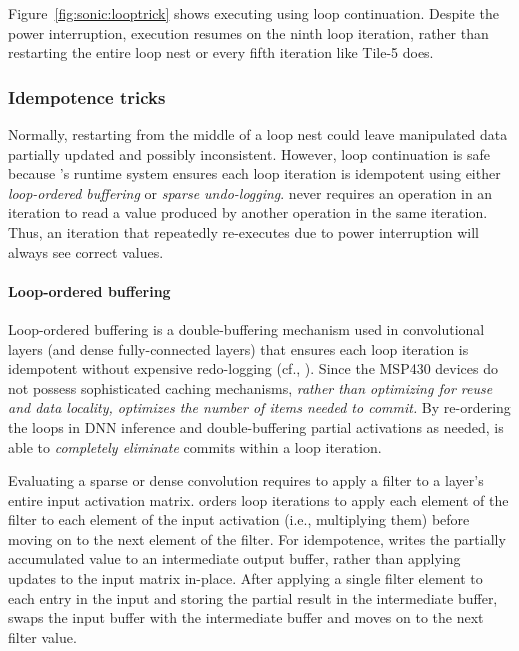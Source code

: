 Figure~\ref{fig:sonic:looptrick} shows \sonic executing using loop
continuation.  Despite the power interruption, execution resumes on the ninth
loop iteration, rather than restarting the entire loop nest or every fifth iteration
like Tile-5 does.

\subsubsection{Idempotence tricks}
\label{sonic:sonic:idempotence}

Normally, restarting from the middle of a loop nest could leave manipulated
data partially updated and possibly inconsistent.  However, loop continuation
is safe because \sonic's runtime system ensures each loop iteration is idempotent
using either {\em loop-ordered buffering} or {\em sparse undo-logging}.
%
\sonic never requires an operation in an iteration to read a value
produced by another operation in the same iteration.
Thus, an iteration that repeatedly re-executes due to power interruption will always
see correct values.

\paragraph{Loop-ordered buffering}
Loop-ordered buffering is a double-buffering mechanism used in convolutional
layers (and dense fully-connected layers)
that ensures each loop iteration is idempotent without expensive redo-logging (cf., \cite{alpaca}). 
%
Since the MSP430 devices do not possess sophisticated caching
mechanisms, \emph{rather than optimizing for reuse and data locality, \sonic
  optimizes the number of items needed to commit.}
%
By re-ordering the loops in DNN inference and double-buffering partial activations as needed,
\sonic is able to \emph{completely eliminate} commits within a loop iteration.

Evaluating a sparse or dense convolution requires \sonic to apply a filter to a
layer's entire input activation matrix.  
%
\sonic orders loop iterations to apply each element of the filter to each
element of the input activation (i.e., multiplying them) before moving on
to the next element of the filter.
%
For idempotence,
\sonic writes the partially accumulated value to an intermediate output buffer,
rather than applying updates to the input matrix in-place.
%
After applying a single filter element to each entry in the input and storing
the partial result in the intermediate buffer, \sonic swaps the input
buffer with the intermediate buffer and moves on to the next filter value.

